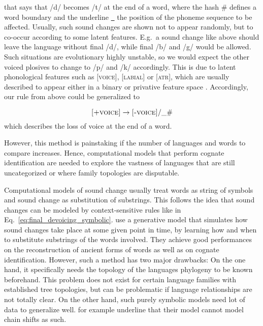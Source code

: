 \documentclass[6pt]{article}
\begin{document}
\noindent that says that /d/ becomes /t/ at the end of a word, where the hash \# defines a word boundary and the underline \underline{\ } the position of the phoneme sequence to be affected. Usually, such sound changes are shown not to appear randomly, but to co-occur according to some latent features. E.g.\ a sound change like above should leave the language without final /d/, while final /b/ and /g/ would be allowed. Such situations are evolutionary highly unstable, so we would expect the other voiced plosives to change to /p/ and /k/ accordingly. This is due to latent phonological features such as \textsc{[voice]}, \textsc{[labial]} or \textsc{[atr]}, which are usually described to appear either in a binary or privative feature space \citep{chomsky1968sound}. Accordingly, our rule from above could be generalized to

\begin{equation}
\textsc{[+voice]} \rightarrow \textsc{[-voice]} / \_ \#
\label{eq:final_devoicing}
\end{equation}
which describes the loss of voice at the end of a word.

However, this method is painstaking if the number of languages and words to compare increases. Hence, computational models that perform cognate identification are needed to explore the vastness of languages that are still uncategorized or where family topologies are disputable.

Computational models of sound change usually treat words as string of symbols and sound change as substitution of substrings. This follows the idea that sound changes can be modeled by context-sensitive rules like in Eq.~\ref{eq:final_devoicing_symbolic}. \cite{bouchard2007probabilistic,bouchard2013automated} use a generative model that simulates how sound changes take place at some given point in time, by learning how and when to substitute substrings of the words involved. They achieve good performances on the reconstruction of ancient forms of words as well as on cognate identification. However, such a method has two major drawbacks: On the one hand, it specifically needs the topology of the languages phylogeny to be known beforehand. This problem does not exist for certain language families with established tree topologies, but can be problematic if language relationships are not totally clear. On the other hand, such purely symbolic models need lot of data to generalize well. \cite{bouchard2007probabilistic} for example underline that their model cannot model chain shifts as such.
\end{document}

